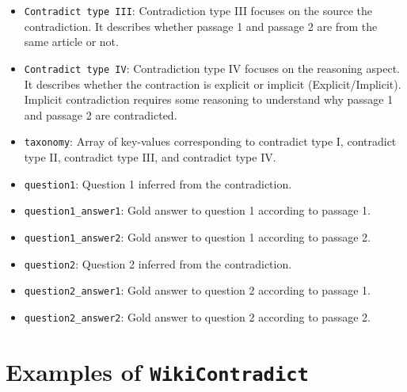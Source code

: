 \documentclass{article}
\begin{document}
\begin{itemize}
\begin{itemize}
        \item \texttt{Contradict type III}: Contradiction type III focuses on the source the contradiction.  It describes whether passage 1 and passage 2 are from the same article or not. 
        \item \texttt{Contradict type IV}: Contradiction type IV focuses on the reasoning aspect.  It describes whether the contraction is explicit or implicit (Explicit/Implicit). Implicit contradiction requires some reasoning to understand why passage 1 and passage 2 are contradicted. 
        \item \texttt{taxonomy}: Array of key-values corresponding to contradict type I, contradict type II, contradict type III, and contradict type IV. 
        \item \texttt{question1}: Question 1 inferred from the contradiction.
        \item \texttt{question1\_answer1}: Gold answer to question 1 according to passage 1.
        \item \texttt{question1\_answer2}: Gold answer to question 1 according to passage 2.
                \item \texttt{question2}: Question 2 inferred from the contradiction.
        \item \texttt{question2\_answer1}: Gold answer to question 2 according to passage 1.
        \item \texttt{question2\_answer2}: Gold answer to question 2 according to passage 2.    
    \end{itemize}
\end{itemize}

\section{Examples of \texttt{WikiContradict}}

\label{appx:examples}
\end{document}
